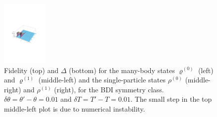 \begin{figure}[h!]
\begin{minipage}{1.22\textwidth}
\begin{flushleft}
\includegraphics[width=0.20\textwidth,height=0.15\textwidth]{plot6}
\end{flushleft}
\end{minipage}
\begin{minipage}{1\textwidth}	
\caption{Fidelity (top) and $\Delta$ (bottom) for the many-body states $\varrho^{(0)}$ (left) and $\varrho^{(1)}$ (middle-left) and the single-particle states $\rho^{(0)}$ (middle-right) and $\rho^{(1)}$ (right), for the BDI symmetry class. $\delta \theta =\theta'-\theta=0.01$ and $\delta T=T'-T=0.01$. The small step in the top middle-left plot is due to numerical instability.}
\label{fig:fidelityBDI}
\end{minipage}
\end{figure}

